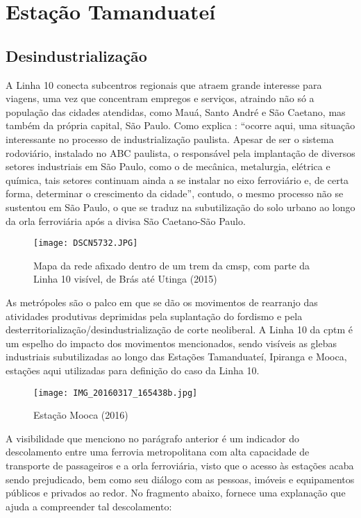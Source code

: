 \documentclass[11pt,fleqn]{book} %
\begin{document}
\section{Estação Tamanduateí}

\subsection{Desindustrialização}

A Linha 10 conecta subcentros regionais que atraem grande interesse para viagens, uma vez que concentram empregos e serviços, atraindo não só a população das cidades atendidas, como Mauá, Santo André e São Caetano, mas também da própria capital, São Paulo\cite[p. 66]{Ferreira}. Como explica \cite[p. 115]{Stefani}: ``ocorre aqui, uma situação interessante no processo de industrialização paulista. Apesar de ser o sistema rodoviário, instalado no ABC paulista, o responsável pela implantação de diversos setores industriais em São Paulo, como o de mecânica, metalurgia, elétrica e química, tais setores continuam ainda a se instalar no eixo ferroviário e, de certa forma, determinar o crescimento da cidade'', contudo, o mesmo processo não se sustentou em São Paulo, o que se traduz na subutilização do solo urbano ao longo da orla ferroviária após a divisa São Caetano-São Paulo.

\begin{figure}[h]
	\caption{Mapa da rede afixado dentro de um trem da \gls{cmsp}, com parte da Linha 10 visível, de Brás até Utinga (2015)}
	\texttt{[image: DSCN5732.JPG]}
\end{figure}

As metrópoles são o palco em que se dão os movimentos de rearranjo das atividades produtivas deprimidas pela suplantação do fordismo e pela desterritorialização/desindustrialização de corte neoliberal\cite{Acselrad}. A Linha 10 da \gls{cptm} é um espelho do impacto dos movimentos mencionados, sendo visíveis as glebas industriais subutilizadas ao longo das Estações Tamanduateí, Ipiranga e Mooca, estações aqui utilizadas para definição do caso da Linha 10.

\begin{figure}[h]
	\caption{Estação Mooca (2016)}
	\texttt{[image: IMG\_20160317\_165438b.jpg]}
\end{figure}

A visibilidade que menciono no parágrafo anterior é um indicador do descolamento entre uma ferrovia metropolitana com alta capacidade de transporte de passageiros e a orla ferroviária, visto que o acesso às estações acaba sendo prejudicado, bem como seu diálogo com as pessoas, imóveis e equipamentos públicos e privados ao redor. No fragmento abaixo, \cite{Acselrad} fornece uma explanação que ajuda a compreender tal descolamento:
\end{document}

